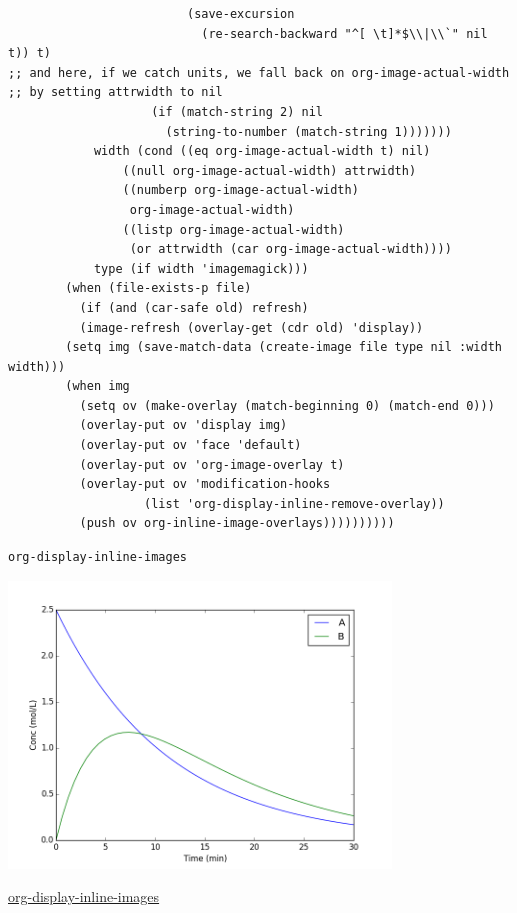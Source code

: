 \documentclass[aps,prb,citeautoscript,preprint,citeautoscript,showkeys]{revtex4-1}
\begin{document}
\begin{verbatim}
					     (save-excursion
					       (re-search-backward "^[ \t]*$\\|\\`" nil t)) t)
;; and here, if we catch units, we fall back on org-image-actual-width
;; by setting attrwidth to nil
					(if (match-string 2) nil
					  (string-to-number (match-string 1)))))))
		    width (cond ((eq org-image-actual-width t) nil)
				((null org-image-actual-width) attrwidth)
				((numberp org-image-actual-width)
				 org-image-actual-width)
				((listp org-image-actual-width)
				 (or attrwidth (car org-image-actual-width))))
		    type (if width 'imagemagick)))
	    (when (file-exists-p file)
	      (if (and (car-safe old) refresh)
		  (image-refresh (overlay-get (cdr old) 'display))
		(setq img (save-match-data (create-image file type nil :width width)))
		(when img
		  (setq ov (make-overlay (match-beginning 0) (match-end 0)))
		  (overlay-put ov 'display img)
		  (overlay-put ov 'face 'default)
		  (overlay-put ov 'org-image-overlay t)
		  (overlay-put ov 'modification-hooks
			       (list 'org-display-inline-remove-overlay))
		  (push ov org-inline-image-overlays))))))))))
\end{verbatim}

\begin{verbatim}
org-display-inline-images

\end{verbatim}

\includegraphics[width=4in]{./images/batch-multiple.png}

\url{org-display-inline-images}
\end{document}
